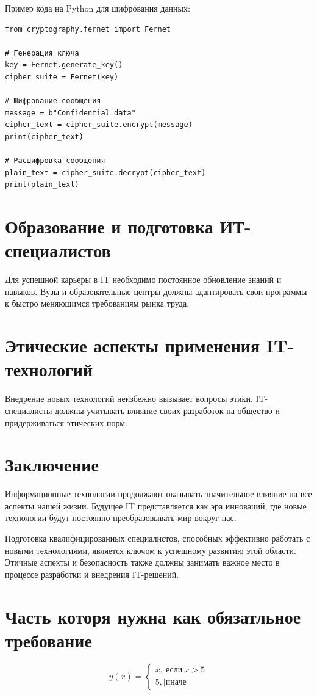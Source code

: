Пример кода на Python для шифрования данных:
\begin{verbatim}
from cryptography.fernet import Fernet

# Генерация ключа
key = Fernet.generate_key()
cipher_suite = Fernet(key)

# Шифрование сообщения
message = b"Confidential data"
cipher_text = cipher_suite.encrypt(message)
print(cipher_text)

# Расшифровка сообщения
plain_text = cipher_suite.decrypt(cipher_text)
print(plain_text)
\end{verbatim}

\section{Образование и подготовка ИТ-специалистов}
Для успешной карьеры в IT необходимо постоянное обновление знаний и навыков. Вузы и образовательные центры должны адаптировать свои программы к быстро меняющимся требованиям рынка труда.

\section{Этические аспекты применения IT-технологий}
Внедрение новых технологий неизбежно вызывает вопросы этики. IT-специалисты должны учитывать влияние своих разработок на общество и придерживаться этических норм.

\section{Заключение}
Информационные технологии продолжают оказывать значительное влияние на все аспекты нашей жизни. Будущее IT представляется как эра инноваций, где новые технологии будут постоянно преобразовывать мир вокруг нас. 

Подготовка квалифицированных специалистов, способных эффективно работать с новыми технологиями, является ключом к успешному развитию этой области. Этичные аспекты и безопасность также должны занимать важное место в процессе разработки и внедрения IT-решений.
    \section{Часть которя нужна как обязатльное требование}

    \begin{equation}
    y(x)=
        \begin{cases}
            x, ~ \text{если} ~ x>5
            \\
            5, | \text{иначе}
        \end{cases}
\end{equation}

